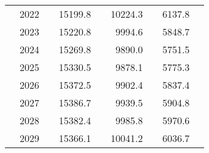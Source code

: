 \begin{table}
\begin{tabular}[t]{>{}l|l>{}rr>{}r|rrrr}
 & 2022 & \cellcolor[HTML]{8A8779}{\textcolor{white}{700.0000}} & 15199.8 & \cellcolor[HTML]{44BF70}{\textcolor{white}{0.299}} & 10224.3 & \cellcolor[HTML]{25AB82}{\textcolor{white}{0.387}} & 6137.8 & \cellcolor[HTML]{23A983}{\textcolor{white}{0.397}}\\

 & 2023 & \cellcolor[HTML]{B0A473}{\textcolor{white}{642.3000}} & 15220.8 & \cellcolor[HTML]{44BF70}{\textcolor{white}{0.299}} & 9994.6 & \cellcolor[HTML]{27AD81}{\textcolor{white}{0.378}} & 5848.7 & \cellcolor[HTML]{27AD81}{\textcolor{white}{0.378}}\\

 & 2024 & \cellcolor[HTML]{AFA473}{\textcolor{white}{642.9000}} & 15269.8 & \cellcolor[HTML]{42BE71}{\textcolor{white}{0.300}} & 9890.0 & \cellcolor[HTML]{28AE80}{\textcolor{white}{0.374}} & 5751.5 & \cellcolor[HTML]{28AE80}{\textcolor{white}{0.372}}\\

 & 2025 & \cellcolor[HTML]{9E9677}{\textcolor{white}{668.2000}} & 15330.5 & \cellcolor[HTML]{42BE71}{\textcolor{white}{0.301}} & 9878.1 & \cellcolor[HTML]{28AE80}{\textcolor{white}{0.374}} & 5775.3 & \cellcolor[HTML]{28AE80}{\textcolor{white}{0.373}}\\

 & 2026 & \cellcolor[HTML]{908B79}{\textcolor{white}{691.4284}} & 15372.5 & \cellcolor[HTML]{42BE71}{\textcolor{white}{0.302}} & 9902.4 & \cellcolor[HTML]{28AE80}{\textcolor{white}{0.374}} & 5837.4 & \cellcolor[HTML]{27AD81}{\textcolor{white}{0.377}}\\

 & 2027 & \cellcolor[HTML]{868379}{\textcolor{white}{706.2000}} & 15386.7 & \cellcolor[HTML]{42BE71}{\textcolor{white}{0.302}} & 9939.5 & \cellcolor[HTML]{27AD81}{\textcolor{white}{0.376}} & 5904.8 & \cellcolor[HTML]{26AD81}{\textcolor{white}{0.382}}\\

 & 2028 & \cellcolor[HTML]{848079}{\textcolor{white}{712.3000}} & 15382.4 & \cellcolor[HTML]{42BE71}{\textcolor{white}{0.302}} & 9985.8 & \cellcolor[HTML]{27AD81}{\textcolor{white}{0.378}} & 5970.6 & \cellcolor[HTML]{25AC82}{\textcolor{white}{0.386}}\\

 & 2029 & \cellcolor[HTML]{838079}{\textcolor{white}{713.0000}} & 15366.1 & \cellcolor[HTML]{42BE71}{\textcolor{white}{0.302}} & 10041.2 & \cellcolor[HTML]{26AD81}{\textcolor{white}{0.380}} & 6036.7 & \cellcolor[HTML]{25AB82}{\textcolor{white}{0.390}}\\


\end{tabular}
\end{table}
